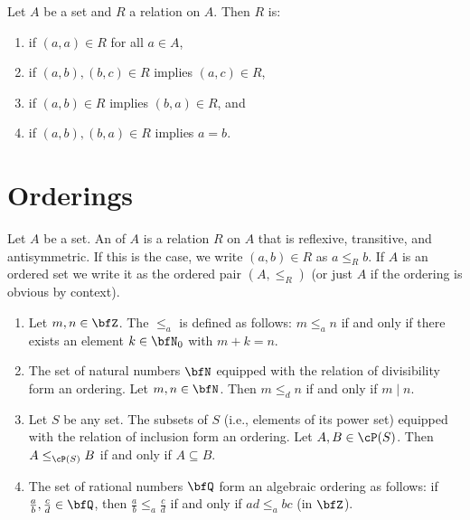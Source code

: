     \begin{definition}
        Let $A$ be a set and $R$ a relation on $A$. Then $R$ is:
            \begin{enumerate}[label = (\arabic*)]
                \item {} if $(a,a) \in R$ for all $a \in A$,
                \item {} if $(a,b),(b,c) \in R$ implies $(a,c) \in R$,
                \item {} if $(a,b) \in R$ implies $(b,a) \in R$, and
                \item {} if $(a,b),(b,a) \in R$ implies $a = b$.
            \end{enumerate}
    \end{definition}
    
\section{Orderings}
    \begin{definition}
        Let $A$ be a set. An  of $A$ is a relation $R$ on $A$ that is reflexive, transitive, and antisymmetric. If this is the case, we write $(a,b) \in R$ as $a \leq_R b$. If $A$ is an ordered set we write it as the ordered pair $(A,\leq_R)$ (or just $A$ if the ordering is obvious by context).
    \end{definition}

    \begin{example}\label{example:orderings}
        \phantom{a}
        \begin{enumerate}[label = (\arabic*)]
            \item Let $m,n \in \bfZ$. The  $\leq_a$ is defined as follows: $m \leq_a n$ if and only if there exists an element $k \in \bfN_0$ with $m + k = n$.
            \item The set of natural numbers $\bfN$ equipped with the relation of divisibility form an ordering. Let $m,n \in \bfN$. Then $m \leq_d n$ if and only if $m \mid n$.
            \item Let $S$ be any set. The subsets of $S$ (i.e., elements of its power set) equipped with the relation of inclusion form an ordering. Let $A,B \in \cP(S)$. Then $A \leq_{\cP(S)} B$ if and only if $A \subseteq B$.
            \item The set of rational numbers $\bfQ$ form an algebraic ordering as follows: if $\frac{a}{b},\frac{c}{d} \in \bfQ$, then $\frac{a}{b} \leq_a \frac{c}{d}$ if and only if $ad \leq_a bc$ (in $\bfZ$).
        \end{enumerate}
    \end{example}

